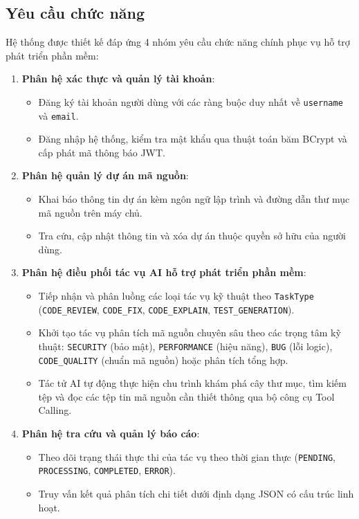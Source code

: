 \documentclass[12pt,a4paper]{report}
\begin{document}
\subsection{Yêu cầu chức năng}
Hệ thống được thiết kế đáp ứng 4 nhóm yêu cầu chức năng chính phục vụ hỗ trợ phát triển phần mềm:
\begin{enumerate}
    \item \textbf{Phân hệ xác thực và quản lý tài khoản}:
    \begin{itemize}
        \item Đăng ký tài khoản người dùng với các ràng buộc duy nhất về \texttt{username} và \texttt{email}.
        \item Đăng nhập hệ thống, kiểm tra mật khẩu qua thuật toán băm BCrypt và cấp phát mã thông báo JWT.
    \end{itemize}
    \item \textbf{Phân hệ quản lý dự án mã nguồn}:
    \begin{itemize}
        \item Khai báo thông tin dự án kèm ngôn ngữ lập trình và đường dẫn thư mục mã nguồn trên máy chủ.
        \item Tra cứu, cập nhật thông tin và xóa dự án thuộc quyền sở hữu của người dùng.
    \end{itemize}
    \item \textbf{Phân hệ điều phối tác vụ AI hỗ trợ phát triển phần mềm}:
    \begin{itemize}
        \item Tiếp nhận và phân luồng các loại tác vụ kỹ thuật theo \texttt{TaskType} (\texttt{CODE\_REVIEW}, \texttt{CODE\_FIX}, \texttt{CODE\_EXPLAIN}, \texttt{TEST\_GENERATION}).
        \item Khởi tạo tác vụ phân tích mã nguồn chuyên sâu theo các trọng tâm kỹ thuật: \texttt{SECURITY} (bảo mật), \texttt{PERFORMANCE} (hiệu năng), \texttt{BUG} (lỗi logic), \texttt{CODE\_QUALITY} (chuẩn mã nguồn) hoặc phân tích tổng hợp.
        \item Tác tử AI tự động thực hiện chu trình khám phá cây thư mục, tìm kiếm tệp và đọc các tệp tin mã nguồn cần thiết thông qua bộ công cụ Tool Calling.
    \end{itemize}
    \item \textbf{Phân hệ tra cứu và quản lý báo cáo}:
    \begin{itemize}
        \item Theo dõi trạng thái thực thi của tác vụ theo thời gian thực (\texttt{PENDING}, \texttt{PROCESSING}, \texttt{COMPLETED}, \texttt{ERROR}).
        \item Truy vấn kết quả phân tích chi tiết dưới định dạng JSON có cấu trúc linh hoạt.
    \end{itemize}
\end{enumerate}
\end{document}
